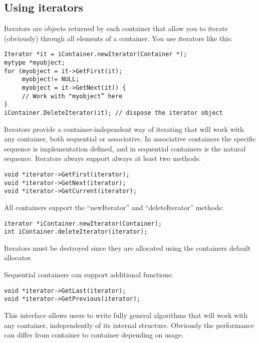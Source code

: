 \documentclass[12pt,a4paper]{memoir} %
\begin{document}
\subsection{Using iterators}
Iterators are objects returned by each container that allow you to iterate (obviously) through all elements of a container.
You use iterators like this:
\begin{verbatim}
Iterator *it = iContainer.newIterator(Container *);
mytype *myobject;
for (myobject = it->GetFirst(it); 
     myobject!= NULL; 
     myobject = it->GetNext(it)) {
     // Work with "myobject” here
}
iContainer.DeleteIterator(it); // dispose the iterator object
\end{verbatim}
Iterators provide a container-independent way of iterating that will work with any container, both sequential or associative. In associative containers the specific sequence is implementation defined, and in sequential containers is the natural sequence.
Iterators always support always at least two methods:
\begin{verbatim}
void *iterator->GetFirst(iterator);
void *iterator->GetNext(iterator);
void *iterator->GetCurrent(iterator);
\end{verbatim}
All containers support the “newIterator”  and “deleteIterator” methods:
\begin{verbatim}
iterator *iContainer.newIterator(Container); 
int iContainer.deleteIterator(iterator);
\end{verbatim}
Iterators must be destroyed since they are allocated using the containers default allocator.

Sequential containers can support additional functions:
\begin{verbatim}
void *iterator->GetLast(iterator);
void *iterator->GetPrevious(iterator);
\end{verbatim}
This interface allows users to write fully general algorithms that will work with any container, independently of its internal structure. Obviously the performance can differ from container to container depending on usage.
\end{document}
